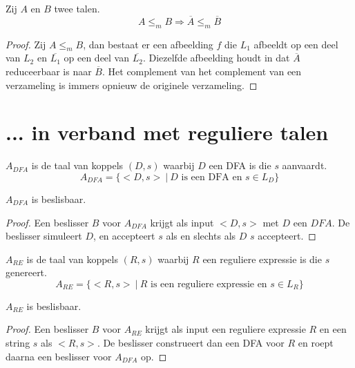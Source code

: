 \documentclass[main.tex]{subfiles}
\begin{document}
\begin{st}
  \label{st:reduceerbaarheid-taal-complement}
  Zij $A$ en $B$ twee talen.
  \[ A \le_m B \Rightarrow \overline{A} \le_m \overline{B} \]

  \begin{proof}
    Zij $A \le_{m} B$, dan bestaat er een afbeelding $f$ die $L_{1}$ afbeeldt op een deel van $L_{2}$ en $\overline{L_{1}}$ op een deel van $\overline{L_{2}}$.
    Diezelfde afbeelding houdt in dat $\overline{A}$ reduceerbaar is naar $\overline{B}$.
    Het complement van het complement van een verzameling is immers opnieuw de originele verzameling.
  \end{proof}
\end{st}

\section{... in verband met reguliere talen}
\label{sec:verb-met-regul}

\begin{de}
  \label{de:a-dfa}
  $A_{DFA}$ is de taal van koppels $(D,s)$ waarbij $D$ een DFA is die $s$ aanvaardt.
  \[ A_{DFA} = \{ <D,s> \ |\ D \text{ is een DFA en } s \in L_{D} \} \]
\end{de}

\begin{st}
  \label{st:a-dfa-besl}
  $A_{DFA}$ is beslisbaar.

  \begin{proof}
    Een beslisser $B$ voor $A_{DFA}$ krijgt als input $<D,s>$ met $D$ een $DFA$.
    De beslisser simuleert $D$, en accepteert $s$ als en slechts als $D$ $s$ accepteert.
  \end{proof}
\end{st}

\begin{de}
  \label{de:a-re}
  $A_{RE}$ is de taal van koppels $(R,s)$ waarbij $R$ een reguliere expressie is die $s$ genereert.
  \[ A_{RE} = \{ <R,s> \ |\ R \text{ is een reguliere expressie en } s \in L_{R} \} \]
\end{de}

\begin{st}
  \label{st:a-re-besl}
  $A_{RE}$ is beslisbaar.

  \begin{proof}
    Een beslisser $B$ voor $A_{RE}$ krijgt als input een reguliere expressie $R$ en een string $s$ als $<R,s>$.
    De beslisser construeert dan een DFA voor $R$ en roept daarna een beslisser voor $A_{DFA}$ op.
  \end{proof}
\end{st}
\end{document}

